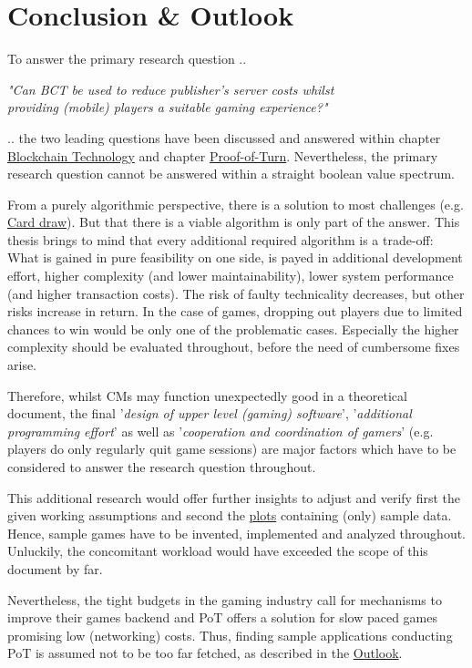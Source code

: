 
\chapter{Conclusion \& Outlook}
\label{chap:ConclusionAndOutLook}

To answer the primary research question ..
\begin{center}
	\textit{"Can \gls{BCT} be used to reduce publisher's server costs whilst \\
		providing (mobile) players a suitable gaming experience?"}
\end{center}
.. the two leading questions have been discussed and answered within chapter 
\hyperref[chap:BCT]{Blockchain Technology} and chapter \hyperref[chap:PoT]{Proof-of-Turn}.
Nevertheless, the primary research question cannot be answered within a straight boolean value spectrum.

\noindent From a purely algorithmic perspective, there is a solution to most challenges (e.g. \hyperref[sec:PileOfCards]{Card draw}).
But that there is a viable algorithm is only part of the answer.
This thesis brings to mind that every additional required algorithm is a trade-off:
What is gained in pure feasibility on one side, is payed in additional development effort, higher complexity (and lower maintainability), lower system performance (and higher transaction costs).
The risk of faulty technicality decreases, but other risks increase in return.
In the case of games, dropping out players due to limited chances to win would be only one of the problematic cases.
Especially the higher complexity should be evaluated throughout, before the need of cumbersome fixes arise.

\noindent Therefore, whilst \gls{CM}s may function unexpectedly good in a theoretical document,
the final '\textit{design of upper level (gaming) software}', '\textit{additional programming effort}' as well as
'\textit{cooperation and coordination of gamers}' (e.g. players do only regularly quit game sessions)
are major factors which have to be considered to answer the research question throughout.

\noindent This additional research would offer further insights to adjust and verify first the given working assumptions
and second the \hyperref[script:GraphPlots]{plots} containing (only) sample data.
Hence, sample games have to be invented, implemented and analyzed throughout.
Unluckily, the concomitant workload would have exceeded the scope of this document by far.

\noindent Nevertheless, the tight budgets in the gaming industry call for mechanisms to improve
their games backend and \gls{PoT} offers a solution for slow paced games promising low (networking) costs.
Thus, finding sample applications conducting \gls{PoT} is assumed not to be too far fetched,
as described in the \hyperref[sec:Outlook]{Outlook}.

